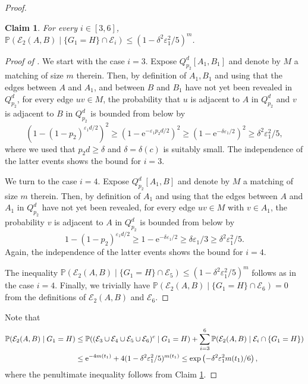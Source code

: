 \documentclass[reqno,final,a4paper]{amsart}
\newtheorem{claim}[thm]{Claim}
\theoremstyle{definition}
\newcommand{\cE}{\mathcal{E}}
\def\e{\mathrm{e}}
\def\eps{\varepsilon}
\newcommand{\1}{\mathbbm{1}}
\begin{document}
\begin{proof}
\begin{claim}\label{cl:E3-E6}
For every $i\in [3,6]$, $\mathbb P(\cE_2(A,B)\mid \{G_1=H\}\cap \cE_i)\le (1-\delta^2\eps^2_1/5)^m$.
\end{claim}
\begin{proof}[Proof of ]
We start with the case $i=3$. Expose $Q^d_{p_2}[A_1,B_1]$ and denote by $M$ a matching of size $m$ therein.
Then, by definition of $A_1,B_1$ and using that the edges between $A$ and $A_1$, and between $B$ and $B_1$ have not yet been revealed in $Q^d_{p_2}$, for every edge $uv\in M$, the probability that $u$ is adjacent to $A$ in $Q^d_{p_2}$ and $v$ is adjacent to $B$ in $Q^d_{p_2}$ is bounded from below by 
$$
(1-(1-p_2)^{\eps_1 d/2})^2 \ge (1-\e^{-\eps_1 p_2d/2})^2 \ge (1-\e^{-\delta \eps_1/2})^2\ge \delta^2 \eps^2_1/5,
$$
where we used that $p_2d\ge \delta$ and $\delta = \delta(c)$ is suitably small.
The independence of the latter events shows the bound for $i=3$.

We turn to the case $i=4$. Expose $Q^d_{p_2}[A_1,B]$ and denote by $M$ a matching of size $m$ therein.
Then, by definition of $A_1$ and using that the edges between $A$ and $A_1$ in $Q^d_{p_2}$ have not yet been revealed, for every edge $uv\in M$ with $v\in A_1$, the probability $v$ is adjacent to $A$ in $Q^d_{p_2}$ is bounded from below by 
$$
1-(1-p_2)^{\eps_1 d/2}\ge 1-\e^{-\delta \eps_1/2}\ge \delta \eps_1/3 \ge \delta^2 \eps^2_1/5.
$$
Again, the independence of the latter events shows the bound for $i=4$.

The inequality $\mathbb P(\cE_2(A,B)\mid \{G_1=H\}\cap \cE_5)\le (1-\delta^2 \eps^2_1/5)^m$ follows as in the case $i=4$. 
Finally, we trivially have $\mathbb P(\cE_2(A,B)\mid \{G_1=H\}\cap \cE_6)=0$ from the definitions of $\cE_2(A,B)$ and $\cE_6$.
\end{proof}

Note that
\begin{align}\label{eq: helping}
\mathbb P(\cE_2(A,B)\mid G_1=H) & \le \mathbb P((\cE_3\cup \cE_4\cup \cE_5\cup \cE_6)^c\mid G_1=H) + \sum_{i=3}^6 \mathbb P(\cE_2(A,B)\mid \cE_i\cap  \{G_1=H\})\notag\\
&\le \e^{-4m(t_1)}+4(1-\delta^2\eps^2_1/5)^{m(t_1)}\le \exp\left(-\delta^2\eps^2_1m(t_1)/6\right),
\end{align}
where the penultimate inequality follows from Claim \ref{cl:E3-E6}. 


\end{proof}
\end{document}

